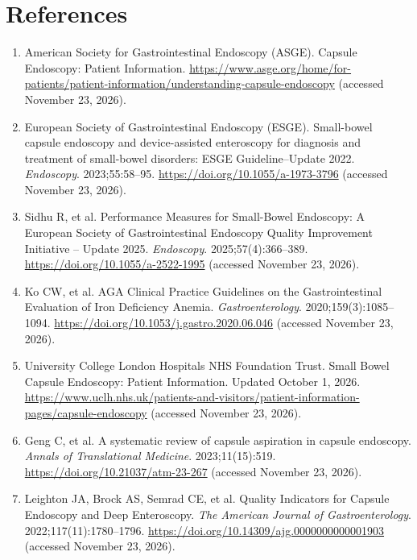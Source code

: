 \section*{References}
\begin{enumerate}
  \item American Society for Gastrointestinal Endoscopy (ASGE). Capsule Endoscopy: Patient Information. \url{https://www.asge.org/home/for-patients/patient-information/understanding-capsule-endoscopy} (accessed November 23, 2026).
  \item European Society of Gastrointestinal Endoscopy (ESGE). Small-bowel capsule endoscopy and device-assisted enteroscopy for diagnosis and treatment of small-bowel disorders: ESGE Guideline--Update 2022. \textit{Endoscopy}. 2023;55:58--95. \url{https://doi.org/10.1055/a-1973-3796} (accessed November 23, 2026).
  \item Sidhu R, et al. Performance Measures for Small-Bowel Endoscopy: A European Society of Gastrointestinal Endoscopy Quality Improvement Initiative -- Update 2025. \textit{Endoscopy}. 2025;57(4):366--389. \url{https://doi.org/10.1055/a-2522-1995} (accessed November 23, 2026).
  \item Ko CW, et al. AGA Clinical Practice Guidelines on the Gastrointestinal Evaluation of Iron Deficiency Anemia. \textit{Gastroenterology}. 2020;159(3):1085--1094. \url{https://doi.org/10.1053/j.gastro.2020.06.046} (accessed November 23, 2026).
  \item University College London Hospitals NHS Foundation Trust. Small Bowel Capsule Endoscopy: Patient Information. Updated October 1, 2026. \url{https://www.uclh.nhs.uk/patients-and-visitors/patient-information-pages/capsule-endoscopy} (accessed November 23, 2026).
  \item Geng C, et al. A systematic review of capsule aspiration in capsule endoscopy. \textit{Annals of Translational Medicine}. 2023;11(15):519. \url{https://doi.org/10.21037/atm-23-267} (accessed November 23, 2026).
  \item Leighton JA, Brock AS, Semrad CE, et al. Quality Indicators for Capsule Endoscopy and Deep Enteroscopy. \textit{The American Journal of Gastroenterology}. 2022;117(11):1780--1796. \url{https://doi.org/10.14309/ajg.0000000000001903} (accessed November 23, 2026).
\end{enumerate}

\clearpage
